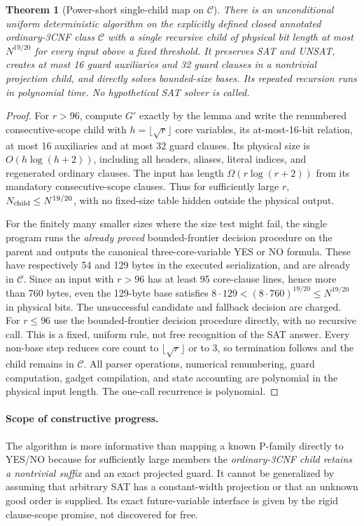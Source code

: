 \documentclass[11pt]{article}
\newtheorem{theorem}{Theorem}
\begin{document}
\begin{theorem}[Power-short single-child map on $\mathcal C$]
There is an unconditional uniform deterministic algorithm on the explicitly defined \emph{closed} annotated ordinary-3CNF class $\mathcal C$ with a single recursive child of physical bit length at most $N^{19/20}$ for every input above a fixed threshold. It preserves SAT and UNSAT, creates at most 16 guard auxiliaries and 32 guard clauses in a nontrivial projection child, and directly solves bounded-size bases. Its repeated recursion runs in polynomial time. No hypothetical SAT solver is called.
\end{theorem}
\begin{proof}
For $r>96$, compute $G'$ exactly by the lemma and write the renumbered consecutive-scope child with $h=\lfloor\sqrt r\rfloor$ core variables, its at-most-16-bit relation, at most 16 auxiliaries and at most 32 guard clauses. Its physical size is $O(h\log(h+2))$, including all headers, aliases, literal indices, and regenerated ordinary clauses. The input has length $\Omega(r\log(r+2))$ from its mandatory consecutive-scope clauses. Thus for sufficiently large $r$, $N_{\rm child}\le N^{19/20}$, with no fixed-size table hidden outside the physical output.

For the finitely many smaller sizes where the size test might fail, the single program runs the \emph{already proved} bounded-frontier decision procedure on the parent and outputs the canonical three-core-variable YES or NO formula. These have respectively 54 and 129 bytes in the executed serialization, and are already in $\mathcal C$. Since an input with $r>96$ has at least 95 core-clause lines, hence more than 760 bytes, even the 129-byte base satisfies $8\cdot129<(8\cdot760)^{19/20}\le N^{19/20}$ in physical bits. The unsuccessful candidate and fallback decision are charged. For $r\le96$ use the bounded-frontier decision procedure directly, with no recursive call. This is a fixed, uniform rule, not free recognition of the SAT answer. Every non-base step reduces core count to $\lfloor\sqrt r\rfloor$ or to 3, so termination follows and the child remains in $\mathcal C$. All parser operations, numerical renumbering, guard computation, gadget compilation, and state accounting are polynomial in the physical input length. The one-call recurrence is polynomial.
\end{proof}
\paragraph{Scope of constructive progress.}
The algorithm is more informative than mapping a known P-family directly to YES/NO because for sufficiently large members the \emph{ordinary-3CNF child retains a nontrivial suffix} and an exact projected guard. It cannot be generalized by assuming that arbitrary SAT has a constant-width projection or that an unknown good order is supplied. Its exact future-variable interface is given by the rigid clause-scope promise, not discovered for free.
\end{document}
